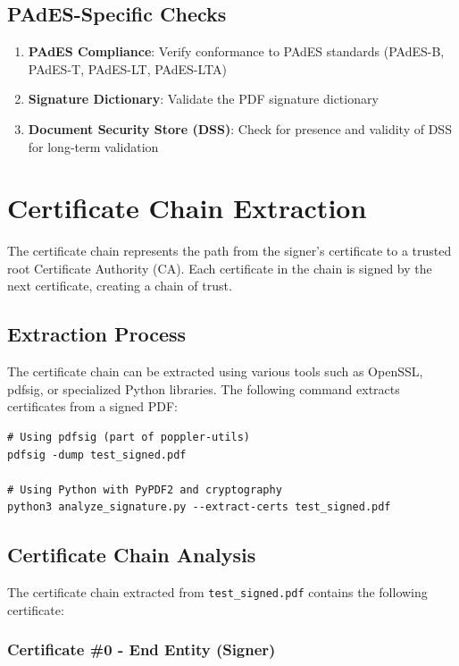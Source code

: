\documentclass[12pt,a4paper]{article}
\begin{document}
\subsection{PAdES-Specific Checks}
\begin{enumerate}
    \item \textbf{PAdES Compliance}: Verify conformance to PAdES standards (PAdES-B, PAdES-T, PAdES-LT, PAdES-LTA)
    \item \textbf{Signature Dictionary}: Validate the PDF signature dictionary
    \item \textbf{Document Security Store (DSS)}: Check for presence and validity of DSS for long-term validation
\end{enumerate}

\section{Certificate Chain Extraction}

The certificate chain represents the path from the signer's certificate to a trusted root Certificate Authority (CA). Each certificate in the chain is signed by the next certificate, creating a chain of trust.

\subsection{Extraction Process}

The certificate chain can be extracted using various tools such as OpenSSL, pdfsig, or specialized Python libraries. The following command extracts certificates from a signed PDF:

\begin{lstlisting}[style=bashstyle, caption={Extracting certificates from signed PDF}]
# Using pdfsig (part of poppler-utils)
pdfsig -dump test_signed.pdf

# Using Python with PyPDF2 and cryptography
python3 analyze_signature.py --extract-certs test_signed.pdf
\end{lstlisting}

\subsection{Certificate Chain Analysis}

The certificate chain extracted from \texttt{test\_signed.pdf} contains the following certificate:

\subsubsection{Certificate \#0 - End Entity (Signer)}
\end{document}
